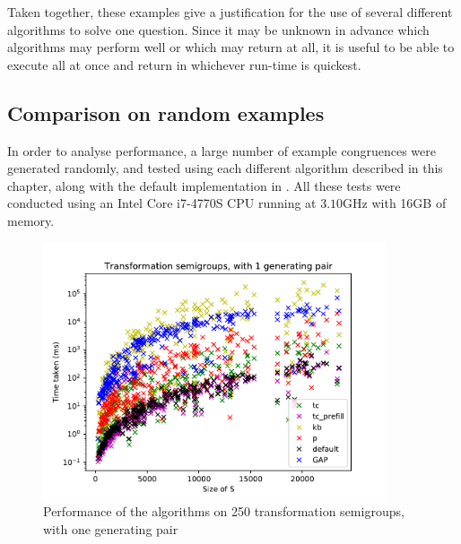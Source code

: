 Taken together, these examples give a justification for the use of several
different algorithms to solve one question.  Since it may be unknown in advance
which algorithms may perform well or which may return at all, it is useful to be
able to execute all at once and return in whichever run-time is quickest.

\subsection{Comparison on random examples}
\label{sec:random-benchmarking}
In order to analyse performance, a large number of example congruences were
generated randomly, and tested using each different algorithm described in this
chapter, along with the default implementation in \GAP{} \cite{gap}.  All these
tests were conducted using an Intel Core i7-4770S CPU running at $3.10$GHz with
16GB of memory.

\begin{figure}[p]
  \centering
  \includegraphics[width=0.9\textwidth]{pics/ch-pairs/bench-trans-1p-times}
  \caption[Benchmark: all algorithms, concrete, 1 pair]
  {Performance of the algorithms on 250 transformation semigroups, with
    one generating pair}
  \label{fig:bench-trans-1p-times}
\end{figure}

